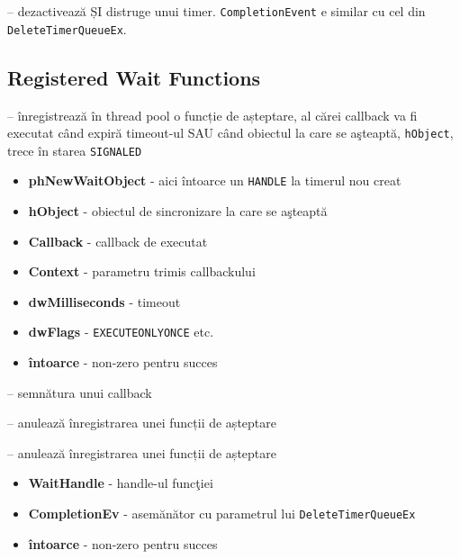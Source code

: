 \documentclass{refcard.cs.pub.ro}
\begin{document}
\begin{multicols*}{3}
 -- dezactivează ȘI distruge unui timer. \texttt{CompletionEvent} e similar cu cel din \texttt{DeleteTimerQueueEx}.

\subsection{Registered Wait Functions}

 -- înregistrează în thread pool o funcție de așteptare, al cărei callback va fi executat când
expiră timeout-ul SAU când obiectul la care se aşteaptă, \texttt{hObject}, trece în starea \texttt{SIGNALED}
\begin{itemize}
  \item \textbf{phNewWaitObject} - aici întoarce un \texttt{HANDLE} la timerul nou creat
  \item \textbf{hObject} - obiectul de sincronizare la care se aşteaptă
  \item \textbf{Callback} - callback de executat
  \item \textbf{Context} - parametru trimis callbackului
  \item \textbf{dwMilliseconds} - timeout
  \item \textbf{dwFlags} - \texttt{EXECUTEONLYONCE} etc.
  \item \textbf{întoarce} - non-zero pentru succes
\end{itemize}

 -- semnătura unui callback
	
 -- anulează înregistrarea unei funcții de așteptare
	
 -- anulează înregistrarea unei funcții de așteptare
\begin{itemize}
  \item \textbf{WaitHandle} - handle-ul funcţiei
  \item \textbf{CompletionEv} - asemănător cu parametrul lui \texttt{DeleteTimerQueueEx}
  \item \textbf{întoarce} - non-zero pentru succes
\end{itemize}

\end{multicols*}
\end{document}
